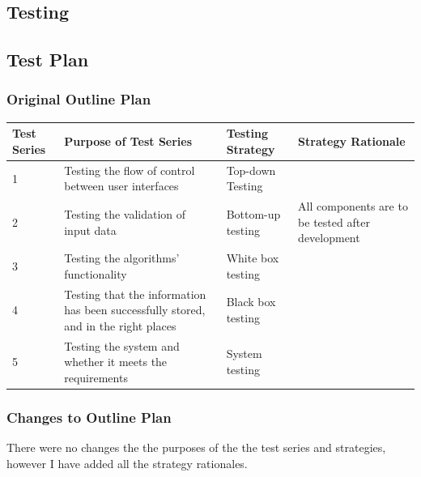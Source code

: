 \begin{landscape}

\chapter{Testing}

\section{Test Plan}

\subsection{Original Outline Plan}

\begin{center}
    \begin{tabular}{|p{2cm}|p{5cm}|p{5cm}|p{4cm}|}
        \hline
        \textbf{Test Series} & \textbf{Purpose of Test Series} & \textbf{Testing Strategy} & \textbf{Strategy Rationale}\\ \hline
        1 & Testing the flow of control between user interfaces & Top-down Testing & \\ \hline
        2 & Testing the validation of input data & Bottom-up testing & All components are to be tested after development \\ \hline
        3 & Testing the algorithms' functionality & White box testing & \\ \hline
        4 & Testing that the information has been successfully stored, and in the right places & Black box testing & \\ \hline
        5 & Testing the system and whether it meets the requirements & System testing & \\ \hline
    \end{tabular}
\end{center}


\subsection{Changes to Outline Plan}

There were no changes the the purposes of the the test series and strategies, however I have added all the strategy rationales.


\end{landscape}
